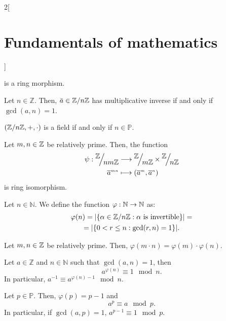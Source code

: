 \documentclass[../../../main.tex]{subfiles}
\begin{document}
\begin{multicols}{2}[\section{Fundamentals of mathematics}]
\begin{theorem}
        is a ring morphism.
    \end{theorem}
    \begin{lemma}
        Let $n\in\mathbb{Z}$. Then, $\bar{a}\in\quot{\ZZ}{n\ZZ}$ has multiplicative inverse if and only if $\gcd(a,n)=1$.
    \end{lemma}
    \begin{corollary}
        $(\quot{\ZZ}{n\ZZ},+,\cdot)$ is a field if and only if $n\in\mathbb{P}$.
    \end{corollary}
    \begin{theorem}
        Let $m,n\in\mathbb{Z}$ be relatively prime. Then, the function
        \begin{align*}
            \psi:\quot{\ZZ}{nm\ZZ}&\longrightarrow\quot{\ZZ}{m\ZZ}\times\quot{\ZZ}{n\ZZ}\\
            \overline{a}^{\scriptscriptstyle mn}&\longmapsto(\overline{a}^{\scriptscriptstyle m},\overline{a}^{\scriptscriptstyle n})
        \end{align*}
        is ring isomorphism.
    \end{theorem}
    \begin{definition}
        Let $n\in\mathbb{N}$. We define the function $\varphi:\mathbb{N}\rightarrow\mathbb{N}$ as: 
        \begin{multline*}
            \varphi(n)=|\{\textstyle\alpha\in\quot{\ZZ}{n\ZZ}:\alpha \text{ is invertible}\}|=\\=|\{0<r\leq n: \gcd(r,n)=1\}|.
        \end{multline*}
    \end{definition}
    \begin{lemma}
        Let $m,n\in\mathbb{Z}$ be relatively prime. Then, $\varphi(m\cdot n)=\varphi(m)\cdot\varphi(n).$
    \end{lemma}
    \begin{theorem}
        Let $a\in\mathbb{Z}$ and $n\in\mathbb{N}$ such that $\gcd(a,n)=1$, then $$a^{\varphi(n)}\equiv 1\mod n.$$ In particular, $a^{-1}\equiv a^{\varphi(n)-1}\mod n$.
    \end{theorem}
    \begin{theorem}
        Let $p\in\mathbb{P}$. Then, $\varphi(p)=p-1$ and $$a^p\equiv a\mod p.$$ In particular, if $\gcd(a,p)=1$, $a^{p-1}\equiv 1\mod p$.
    \end{theorem}

\end{multicols}
\end{document}
